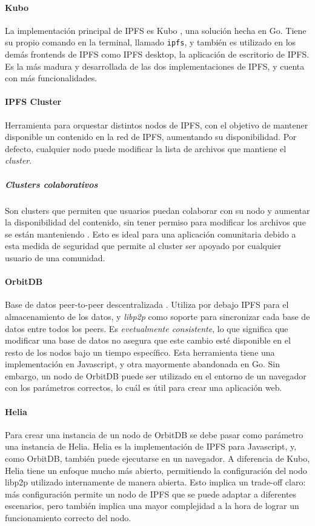\paragraph{Kubo} La implementación principal de IPFS es Kubo \cite{kubo}, una solución hecha en Go. Tiene su propio comando en la terminal, llamado \texttt{ipfs}, y también es utilizado en los demás frontends de IPFS como IPFS desktop, la aplicación de escritorio de IPFS. Es la más madura y desarrollada de las dos implementaciones de IPFS, y cuenta con más funcionalidades.

\paragraph{IPFS Cluster} Herramienta para orquestar distintos nodos de IPFS, con el objetivo de mantener disponible un contenido en la red de IPFS, aumentando su disponibilidad. Por defecto, cualquier nodo puede modificar la lista de archivos que mantiene el \textit{cluster}.
\subparagraph{Clusters colaborativos} Son clusters que permiten que usuarios puedan colaborar con su nodo y aumentar la disponibilidad del contenido, sin tener permiso para modificar los archivos que se están manteniendo \cite{collaborative-clusters}. Esto es ideal para una aplicación comunitaria debido a esta medida de seguridad que permite al cluster ser apoyado por cualquier usuario de una comunidad.

\paragraph{OrbitDB} Base de datos peer-to-peer descentralizada \cite{orbitdb}. Utiliza por debajo IPFS para el almacenamiento de los datos, y \textit{libp2p} como soporte para sincronizar cada base de datos entre todos los peers. Es \textit{evetualmente consistente}, lo que significa que modificar una base de datos no asegura que este cambio esté disponible en el resto de los nodos bajo un tiempo específico. Esta herramienta tiene una implementación en Javascript, y otra mayormente abandonada en Go. Sin embargo, un nodo de OrbitDB puede ser utilizado en el entorno de un navegador con los parámetros correctos, lo cuál es útil para crear una aplicación web.

\paragraph{Helia} Para crear una instancia de un nodo de OrbitDB se debe pasar como parámetro una instancia de Helia. Helia \cite{helia} es la implementación de IPFS para Javascript, y, como OrbitDB, también puede ejecutarse en un navegador. A diferencia de Kubo, Helia tiene un enfoque mucho más abierto, permitiendo la configuración del nodo libp2p utilizado internamente de manera abierta. Esto implica un trade-off claro: más configuración permite un nodo de IPFS que se puede adaptar a diferentes escenarios, pero también implica una mayor complejidad a la hora de lograr un funcionamiento correcto del nodo.

